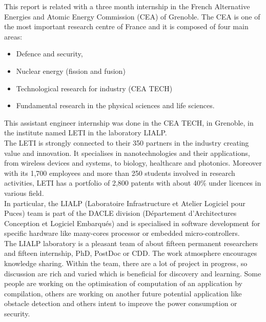 
This report is related with a three month internship in the French Alternative Energies and Atomic Energy Commission (CEA) of Grenoble.
The CEA is one of the most important research centre of France and it is composed of four main areas:
\begin{itemize}
    \item Defence and security,
    \item Nuclear energy (fission and fusion)
    \item Technological research for industry (CEA TECH)
    \item Fundamental research in the physical sciences and life sciences.
\end{itemize}


This assistant engineer internship was done in the CEA TECH, in Grenoble, in the institute named LETI  in the laboratory LIALP. \\

The LETI is strongly connected to their 350 partners in the industry creating value and innovation. It specialises in nanotechnologies and their applications, from wireless devices and systems, to biology, healthcare and photonics. Moreover with its 1,700 employees and more than 250 students involved in research activities, LETI has a portfolio of 2,800 patents with about 40\% under licences in various field.\\

In particular, the LIALP (Laboratoire Infrastructure et Atelier Logiciel pour Puces) team is part of the DACLE  division (Département d’Architectures Conception et Logiciel Embarqués) and is specialised in software development for specific hardware like many-cores processor or embedded micro-controllers. \\

The LIALP laboratory is a pleasant team of about fifteen permanent researchers and fifteen internship, PhD, PostDoc or CDD. The work atmosphere encourages knowledge sharing. Within the team, there are a lot of project in progress, so discussion are rich and varied which is beneficial for discovery and learning. Some people are working on the optimisation of computation of an application by compilation, others are working on another future potential application like obstacle detection and others intent to improve the power consumption or security.